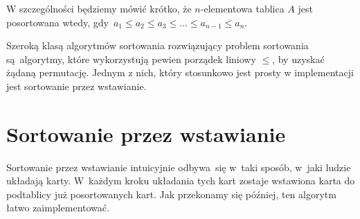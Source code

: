 \begin{remark}
    W szczególności będziemy mówić krótko, że \( n \)-elementowa tablica \( A \) 
    jest posortowana wtedy, 
    gdy~\( a_1 \le a_2 \le a_3 \le \dotso \le a_{n - 1} \le a_n \).
\end{remark}


Szeroką klasą algorytmów sortowania rozwiązujący problem sortowania
są~algorytmy, które wykorzystują pewien porządek liniowy \( \le \),
by uzyskać żądaną permutację. Jednym z nich, który stosunkowo
jest prosty w implementacji jest sortowanie przez wstawianie.

\section{Sortowanie przez wstawianie}

Sortowanie przez wstawianie intuicyjnie odbywa~się w~taki sposób,
w~jaki ludzie układają karty. W~każdym kroku układania tych kart 
zostaje wstawiona karta do podtablicy już posortowanych kart.
Jak przekonamy się później, ten algorytm łatwo zaimplementować.

